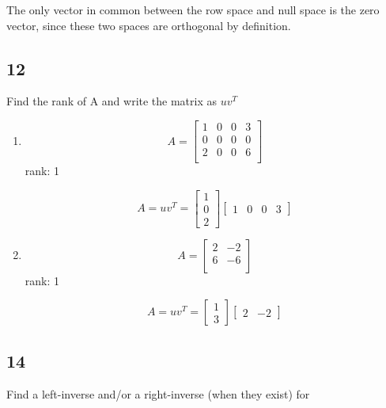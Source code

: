 \documentclass[12pt,letterpaper]{article}
\begin{document}
      The only vector in common between the row space and null space is the zero vector, since these two spaces are orthogonal by definition.
    \subsection*{12}
      Find the rank of A and write the matrix as $uv^T$

      \begin{enumerate}
        \item
          \[
            A = \begin{bmatrix}
              1 & 0 & 0 & 3 \\
              0 & 0 & 0 & 0 \\
              2 & 0 & 0 & 6 \\
            \end{bmatrix}
          \]
          rank: 1

          \[
            A = uv^T =
            \begin{bmatrix}
              1 \\
              0 \\
              2
            \end{bmatrix}
            \begin{bmatrix}
              1 & 0 & 0 & 3
            \end{bmatrix}
          \]

        \item
          \[
            A = \begin{bmatrix}
              2 & -2 \\
              6 & -6 \\
            \end{bmatrix}
          \]
          rank: 1

          \[
            A = uv^T =
            \begin{bmatrix}
              1 \\
              3
            \end{bmatrix}
            \begin{bmatrix}
              2 & -2
            \end{bmatrix}
          \]
      \end{enumerate}
    \subsection*{14}
      Find a left-inverse and/or a right-inverse (when they exist) for
\end{document}
